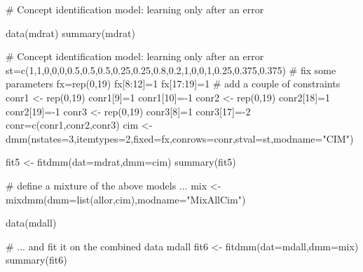 \documentclass[a4paper]{book}
\begin{document}
\begin{Examples}
\begin{ExampleCode}
# Concept identification model: learning only after an error

data(mdrat)
summary(mdrat)

# Concept identification model: learning only after an error
st=c(1,1,0,0,0,0.5,0.5,0.5,0.25,0.25,0.8,0.2,1,0,0,1,0.25,0.375,0.375)
# fix some parameters
fx=rep(0,19)
fx[8:12]=1
fx[17:19]=1
# add a couple of constraints
conr1 <- rep(0,19)
conr1[9]=1
conr1[10]=-1
conr2 <- rep(0,19)
conr2[18]=1
conr2[19]=-1
conr3 <- rep(0,19)
conr3[8]=1
conr3[17]=-2
conr=c(conr1,conr2,conr3)
cim <- dmm(nstates=3,itemtypes=2,fixed=fx,conrows=conr,stval=st,modname="CIM")

fit5 <- fitdmm(dat=mdrat,dmm=cim)
summary(fit5)

# define a mixture of the above models ...
mix <- mixdmm(dmm=list(allor,cim),modname="MixAllCim")

data(mdall)

# ... and fit it on the combined data mdall
fit6 <- fitdmm(dat=mdall,dmm=mix)
summary(fit6)

\end{ExampleCode}
\end{Examples}

\printindex{}
\end{document}

